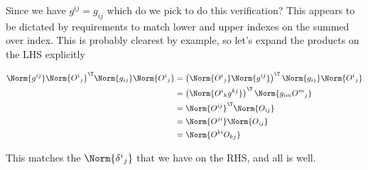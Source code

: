 Since we have $g^{i j} = g_{i j}$ which do we pick to do this verification?  This appears to be dictated by requirements to match lower and upper indexes on the summed over index.  This is probably clearest by example, so let's expand the products on the LHS explicitly

\begin{align*}
\Norm{ g^{i j} } 
\Norm{ {O^{i}}_j } ^\T
\Norm{ g_{i j} }
\Norm{ {O^{i}}_j } 
&=
\left( \Norm{ {O^{i}}_j } 
\Norm{ g^{i j} } \right) ^\T
\Norm{ g_{i j} }
\Norm{ {O^{i}}_j }  \\
&=
\left( \Norm{ {O^{i}}_k g^{k j} } \right) ^\T
\Norm{ g_{i m} {O^{m}}_j }  \\
&=
\Norm{ O^{i j} } ^\T
\Norm{ O_{i j} }  \\
&=
\Norm{ O^{j i} } 
\Norm{ O_{i j} }  \\
&=
\Norm{ O^{k i} O_{k j} }  \\
\end{align*}

This matches the $\Norm{{\delta^i}_j}$ that we have on the RHS, and all is well.

\EndArticle
